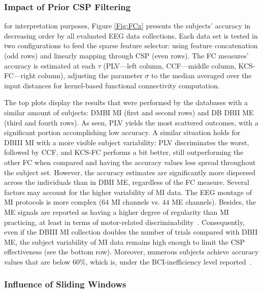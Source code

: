 \subsubsection{Impact of Prior CSP Filtering}

{for interpretation purposes, Figure \ref{Fig:FCx} presents the subjects' accuracy in decreasing order by all evaluated EEG data collections. Each data set is tested in two configurations to feed the sparse feature selector: using feature concatenation (odd rows) and linearly mapping through CSP (even rows). The FC measures' accuracy is estimated at each $\tau$ ({PLV}---left column, {CCF}---middle column, {KCS-FC}---right column), adjusting the parameter $\sigma$ to the median averaged over the input distances for kernel-based functional connectivity computation.} 

{The top plots display the results that were performed by the databases with a similar amount of subjects: DMBI MI (first and second rows) and DB DBII ME (third and fourth rows). As seen, PLV yields the most scattered outcomes, with a significant portion accomplishing low accuracy.} {A similar situation holds for DBIII MI with a more visible subject variability: PLV discriminates the worst, followed by CCF, and KCS-FC performs a bit better, still outperforming the other FC when compared and having the accuracy values less spread throughout the subject set}. However, the accuracy estimates are significantly more dispersed across the individuals than in DBII ME, regardless of the FC measure. Several factors may account for the higher variability of MI data. The EEG montage of MI protocols is more complex ($64$ MI channels vs. $44$ ME channels). Besides, the ME signals are reported as having a higher degree of regularity than MI practicing, at least in terms of motor-related discriminability~\cite{shamsi2020early}. Consequently, even if the DBIII MI collection doubles the number of trials compared with DBII ME, the subject variability of MI data remains high enough to limit the CSP effectiveness (see the bottom row). Moreover, numerous subjects achieve accuracy values that are below $60\%$, which is, under the BCI-inefficiency level reported~\cite{Sanelli2019}. 

\subsubsection{Influence of Sliding Windows}

